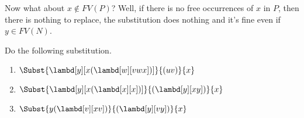 \documentclass[../../../include/open-logic-section]{subfiles}
\begin{document}
Now what about $x \notin FV(P)$? Well, if there is no free occurrences
of $x$ in $P$, then there is nothing to replace, the substitution does
nothing and it's fine even if $y \in FV(N)$.

\begin{prob}
  Do the following substitution.
  \begin{enumerate}
    \item $\Subst{\lambd[y][x(\lambd[w][vwx])]}{(uv)}{x}$
    \item $\Subst{\lambd[y][x(\lambd[x][x])]}{(\lambd[y][xy])}{x}$
    \item $\Subst{y(\lambd[v][xv])}{(\lambd[y][vy])}{x}$
  \end{enumerate}
\end{prob}
\end{document}
